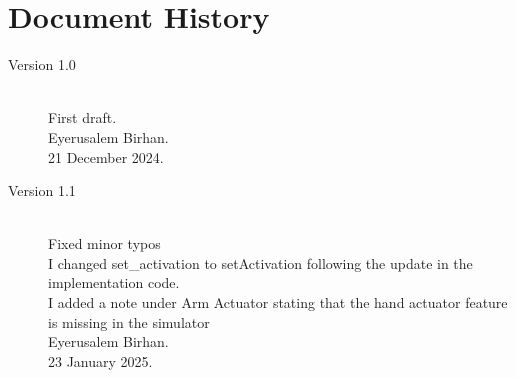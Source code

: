 \documentclass{CSSRforAfrica}
\begin{document}
\pagebreak
\section*{Document History}
\label{document_history}

\begin{description}

\item [Version 1.0]~\\
First draft. \\
Eyerusalem  Birhan. \\ %
21 December 2024. %

\item [Version 1.1]~\\
Fixed minor typos\\
I changed set\_activation  to setActivation following the update in the implementation code.\\
I added a note under Arm Actuator stating that the hand actuator feature is missing in the simulator\\
Eyerusalem  Birhan. \\ %
23 January 2025. %


\end{description}

\end{document}
